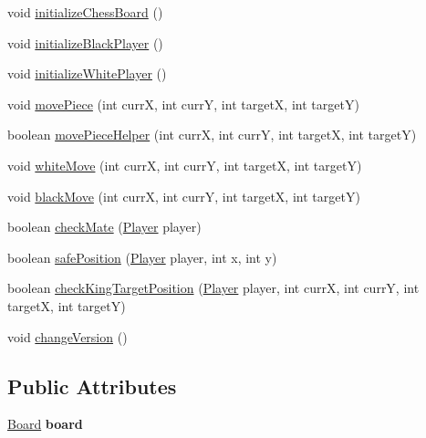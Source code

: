 \begin{DoxyCompactItemize}
void \hyperlink{classchess_build_1_1_game_ae396b8c108a1fc863db4ae1a665de341}{initialize\+Chess\+Board} ()
\item 
void \hyperlink{classchess_build_1_1_game_a11ff0646f34a1aec27b9153c135ed0ba}{initialize\+Black\+Player} ()
\item 
void \hyperlink{classchess_build_1_1_game_ae164441ea754520c20538fcb304ff2d5}{initialize\+White\+Player} ()
\item 
void \hyperlink{classchess_build_1_1_game_ace070bfd577b47865b05b2220048bb0c}{move\+Piece} (int currX, int currY, int targetX, int targetY)
\item 
boolean \hyperlink{classchess_build_1_1_game_a58ffbacab5b8755dd53248b635329807}{move\+Piece\+Helper} (int currX, int currY, int targetX, int targetY)
\item 
void \hyperlink{classchess_build_1_1_game_a7191ea6816333cc8b6d6994e8241f0b5}{white\+Move} (int currX, int currY, int targetX, int targetY)
\item 
void \hyperlink{classchess_build_1_1_game_a42ebac6f010a92be253e201f06fd0487}{black\+Move} (int currX, int currY, int targetX, int targetY)
\item 
boolean \hyperlink{classchess_build_1_1_game_aeb3f335df2f0143f39c6654d02b77a97}{check\+Mate} (\hyperlink{classchess_build_1_1_player}{Player} player)
\item 
boolean \hyperlink{classchess_build_1_1_game_a2e93dda47c0e5c8ec8c7cc234c048b9e}{safe\+Position} (\hyperlink{classchess_build_1_1_player}{Player} player, int x, int y)
\item 
boolean \hyperlink{classchess_build_1_1_game_a594c69523dbb0732107f9809d9c6a80e}{check\+King\+Target\+Position} (\hyperlink{classchess_build_1_1_player}{Player} player, int currX, int currY, int targetX, int targetY)
\item 
void \hyperlink{classchess_build_1_1_game_a873c004e82d9a3bed1f8dec57b781ee5}{change\+Version} ()
\end{DoxyCompactItemize}
\subsection*{Public Attributes}
\begin{DoxyCompactItemize}
\item 
\mbox{\label{classchess_build_1_1_game_a4b725ab015366deb0a7253ad676cc063}} 
\hyperlink{classchess_build_1_1_board}{Board} {\bfseries board}
\end{DoxyCompactItemize}


